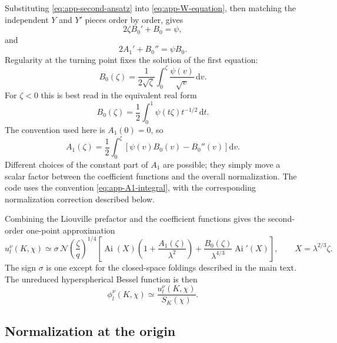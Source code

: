 \documentclass[11pt,a4paper]{article}
\newcommand{\dd}{\mathrm{d}}
\newcommand{\SK}{S_K}
\newcommand{\Ai}{\operatorname{Ai}}
\begin{document}
Substituting \eqref{eq:app-second-ansatz} into
\eqref{eq:app-W-equation}, then matching the independent \(Y\) and \(Y'\)
pieces order by order, gives
\begin{equation}
  2\zeta B_0' + B_0=\psi,
  \label{eq:app-B0-ode}
\end{equation}
and
\begin{equation}
  2A_1' + B_0''=\psi B_0.
  \label{eq:app-A1-ode}
\end{equation}
Regularity at the turning point fixes the solution of the first equation:
\begin{equation}
  B_0(\zeta)=
  \frac{1}{2\sqrt{\zeta}}\int_0^\zeta
  \frac{\psi(v)}{\sqrt v}\,\dd v.
  \label{eq:app-B0-integral}
\end{equation}
For \(\zeta<0\) this is best read in the equivalent real form
\begin{equation}
  B_0(\zeta)=\frac12\int_0^1\psi(t\zeta)t^{-1/2}\,\dd t.
  \label{eq:app-B0-real}
\end{equation}
The convention used here is \(A_1(0)=0\), so
\begin{equation}
  A_1(\zeta)=\frac12\int_0^\zeta
  \left[\psi(v)B_0(v)-B_0''(v)\right]\dd v.
  \label{eq:app-A1-integral}
\end{equation}
Different choices of the constant part of \(A_1\) are possible; they simply
move a scalar factor between the coefficient functions and the overall
normalization.  The code uses the convention \eqref{eq:app-A1-integral}, with
the corresponding normalization correction described below.

Combining the Liouville prefactor and the coefficient functions gives the
second-order one-point approximation
\begin{equation}
  u_l^\nu(K,\chi)\simeq
  \sigma\,\mathcal N
  \left(\frac{\zeta}{q}\right)^{1/4}
  \left[
  \Ai(X)\left(1+\frac{A_1(\zeta)}{\lambda^2}\right)
  +\frac{B_0(\zeta)}{\lambda^{4/3}}\Ai'(X)
  \right],
  \qquad X=\lambda^{2/3}\zeta.
  \label{eq:app-second-order-u}
\end{equation}
The sign \(\sigma\) is one except for the closed-space foldings described in
the main text.  The unreduced hyperspherical Bessel function is then
\begin{equation}
  \phi_l^\nu(K,\chi)\simeq
  \frac{u_l^\nu(K,\chi)}{\SK(\chi)}.
  \label{eq:app-second-order-phi}
\end{equation}

\subsection{Normalization at the origin}
\end{document}

